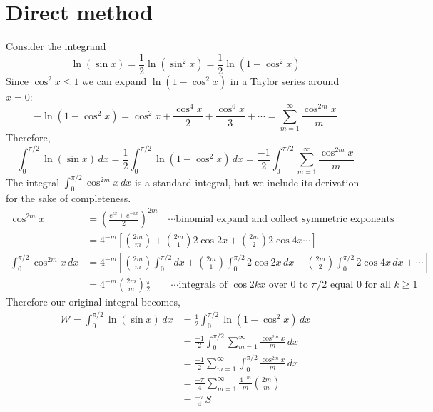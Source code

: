\documentclass[11pt,oneside,reqno]{amsart}
\begin{document}
\section{Direct method}
Consider the integrand
\begin{equation*}
\ln (\sin x) = \frac{1}{2} \ln (\sin^2 x) = \frac{1}{2} \ln (1-\cos^2 x)
\end{equation*}
%
Since $\cos^2 x \leq 1$ we can expand $\ln (1-\cos^2 x)$ in a Taylor series around $x=0$:
\begin{equation*}
-\ln(1-\cos^2 x) = \cos^2 x + \frac{\cos^4 x}{2} + \frac{\cos^6 x}{3} + \cdots = \sum_{m=1}^{\infty}\frac{\cos^{2m} x}{m}
\end{equation*}
%
Therefore,
\begin{equation}
\label{eq:dm1}
\int_0^{\pi/2} \ln(\sin x)\, dx = \frac{1}{2} \int_0^{\pi/2} \ln(1-\cos^2 x)\, dx = \frac{-1}{2} \int_0^{\pi/2} \sum_{m=1}^{\infty}\frac{\cos^{2m} x}{m}
\end{equation}
%
The integral $\int_0^{\pi/2}\cos^{2m}x \,dx$ is a standard integral, but we include its derivation for the sake of completeness.
\begin{align*}
\cos^{2m}x &= \left(\frac{e^{ix}+e^{-ix}}{2}\right)^{2m} \quad\cdots \text{binomial expand and collect symmetric exponents}\\
&=4^{-m}\left[{2m\choose m} + {2m\choose 1} 2 \cos 2x + {2m\choose 2} 2\cos 4x\cdots \right] \\
\int_0^{\pi/2} \cos^{2m}x\, dx &= 4^{-m} \left[{2m \choose m} \int_0^{\pi/2}dx + {2m \choose 1}\int_0^{\pi/2} 2\cos 2x\, dx%
                                               + {2m \choose 2} \int_0^{\pi/2}2\cos 4x\,dx + \cdots \right] \\
&= 4^{-m}{2m \choose m} \frac{\pi}{2} \qquad\cdots\text{integrals of $\cos 2kx$ over $0$ to $\pi/2$ equal $0$ for all $k\geq1$}                                                                                             
\end{align*}
%
Therefore our original integral becomes,
\begin{align*}
\label{eq:dm2}
\mathcal{W}=\int_0^{\pi/2} \ln(\sin x)\, dx &= \frac{1}{2} \int_0^{\pi/2} \ln(1-\cos^2 x)\, dx \\
&= \frac{-1}{2} \int_0^{\pi/2} \sum_{m=1}^{\infty}\frac{\cos^{2m} x}{m}\, dx \\
&= \frac{-1}{2} \sum_{m=1}^{\infty} \int_0^{\pi/2} \frac{\cos^{2m} x}{m}\, dx \\
&= \frac{-\pi}{4} \sum_{m=1}^{\infty} \frac{4^{-m}}{m} {2m\choose m}\\
&= \frac{-\pi}{4} S
\end{align*}
\end{document}
